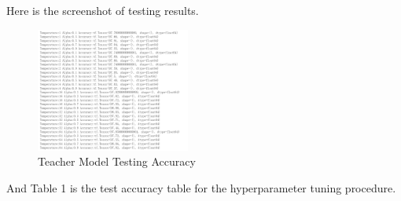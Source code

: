 \documentclass[conference]{IEEEtran}
\begin{document}
  Here is the screenshot of testing results.
  \begin{figure}[h] 
      \centering
      \includegraphics[width=0.45\textwidth]{./graphs/student_accuracy_mnist.png}
      \caption{Teacher Model Testing Accuracy}
      \label{Fig.t1q3e}
  \end{figure}\par
  And Table 1 is the test accuracy table for the hyperparameter tuning procedure.\par
\end{document}
